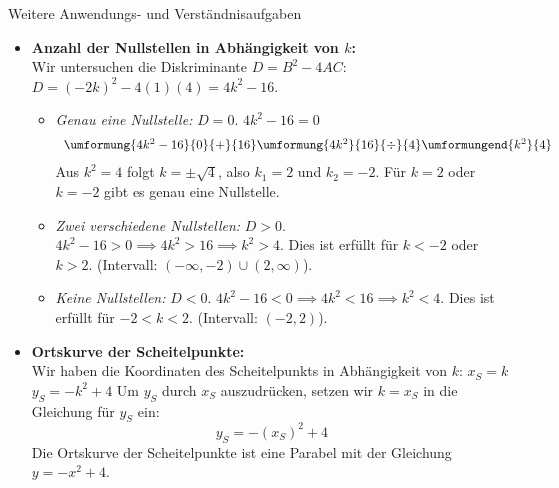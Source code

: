 \begin{loesungsumgebung}{Weitere Anwendungs- und Verständnisaufgaben}
\begin{enumerate}
\begin{itemize}
        \item \textbf{Anzahl der Nullstellen in Abhängigkeit von $k$:} \\
        Wir untersuchen die Diskriminante $D = B^2 - 4AC$:
        $D = (-2k)^2 - 4(1)(4) = 4k^2 - 16$.
        \begin{itemize}
            \item \textit{Genau eine Nullstelle:} $D=0$.
            $4k^2 - 16 = 0$
            $$
            \begin{array}{r c l c l}
            \umformung{4k^2 - 16}{0}{+}{16}
            \umformung{4k^2}{16}{\div}{4}
            \umformungend{k^2}{4}
            \end{array}
            $$
            Aus $k^2=4$ folgt $k = \pm\sqrt{4}$, also $k_1=2$ und $k_2=-2$.
            Für $k=2$ oder $k=-2$ gibt es genau eine Nullstelle.
            \item \textit{Zwei verschiedene Nullstellen:} $D>0$.
            $4k^2 - 16 > 0 \implies 4k^2 > 16 \implies k^2 > 4$.
            Dies ist erfüllt für $k < -2$ oder $k > 2$. (Intervall: $(-\infty, -2) \cup (2, \infty)$).
            \item \textit{Keine Nullstellen:} $D<0$.
            $4k^2 - 16 < 0 \implies 4k^2 < 16 \implies k^2 < 4$.
            Dies ist erfüllt für $-2 < k < 2$. (Intervall: $(-2, 2)$).
        \end{itemize}

        \item \textbf{Ortskurve der Scheitelpunkte:} \\
        Wir haben die Koordinaten des Scheitelpunkts in Abhängigkeit von $k$:
        $x_S = k$
        $y_S = -k^2 + 4$
        Um $y_S$ durch $x_S$ auszudrücken, setzen wir $k=x_S$ in die Gleichung für $y_S$ ein:
        $$ y_S = -(x_S)^2 + 4 $$
        Die Ortskurve der Scheitelpunkte ist eine Parabel mit der Gleichung $y = -x^2 + 4$.
    \end{itemize}
\end{enumerate}

\end{loesungsumgebung}

